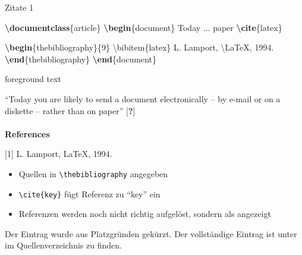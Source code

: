 \documentclass[aspectratio=169]{beamer}
\providecommand{\tightlist}{\setlength{\itemsep}{0pt}\setlength{\parskip}{0pt}}
\newenvironment{Shaded}{\begin{snugshade}}{\end{snugshade}}
\newcommand{\BuiltInTok}[1]{\textcolor[rgb]{0.25,0.67,0.19}{\textbf{#1}}}
\newcommand{\ExtensionTok}[1]{\textcolor[rgb]{0.25,0.67,0.19}{#1}}
\newcommand{\FunctionTok}[1]{\textcolor[rgb]{0.34,0.51,0.35}{#1}}
\newcommand{\KeywordTok}[1]{\textcolor[rgb]{0.25,0.67,0.19}{\textbf{#1}}}
\newcommand{\NormalTok}[1]{\textcolor[rgb]{0.19,0.19,0.19}{#1}}
\newenvironment{Shaded}{}{}
\newcommand\citestyle[1]{\textcolor{foreground-secondary}{\textsuperscript{#1}}}
\let\oldcite=\cite
\renewcommand{\cite}[1]{\citestyle{\oldcite{#1}}}
\let\oldautocite\autocite
\renewcommand{\autocite}[1]{\citestyle{\oldautocite{#1}}}
\begin{document}
    \begin{frame}[fragile]{Zitate 1}
    \protect\hypertarget{zitate-1}{}
    \begin{minipage}{0.66\textwidth}

\begin{Shaded}
\begin{Highlighting}[]
\BuiltInTok{\textbackslash{}documentclass}\NormalTok{\{}\ExtensionTok{article}\NormalTok{\}}
\KeywordTok{\textbackslash{}begin}\NormalTok{\{}\ExtensionTok{document}\NormalTok{\}}
\NormalTok{\textasciigrave{}\textasciigrave{}Today ... paper\textquotesingle{}\textquotesingle{} }\KeywordTok{\textbackslash{}cite}\NormalTok{\{}\ExtensionTok{latex}\NormalTok{\}}

\KeywordTok{\textbackslash{}begin}\NormalTok{\{}\ExtensionTok{thebibliography}\NormalTok{\}\{9\}}
    \FunctionTok{\textbackslash{}bibitem}\NormalTok{\{latex\} }
\NormalTok{    L. Lamport, }\FunctionTok{\textbackslash{}LaTeX}\NormalTok{, 1994.}
\KeywordTok{\textbackslash{}end}\NormalTok{\{}\ExtensionTok{thebibliography}\NormalTok{\}}
\KeywordTok{\textbackslash{}end}\NormalTok{\{}\ExtensionTok{document}\NormalTok{\}}
\end{Highlighting}
\end{Shaded}

    \end{minipage}\begin{minipage}{0.33\textwidth}

    \bgroup 
        \begin{OutputBox}
        \begin{beamercolorbox}{foreground text}
            \selectfont%

    ``Today you are likely to send a 
    document electronically -- by e-mail 
    or on a diskette -- 
    rather than on paper'' [\textbf{?}]
    \\ \\
    \textbf{\Large References}

    [1] L. Lamport, \LaTeX, 1994.

            \end{beamercolorbox}
        \end{OutputBox}
    \egroup

    \end{minipage}

    \begin{itemize}
    \tightlist
    \item
      Quellen in \texttt{\textbackslash{}thebibliography} angegeben
      \autocite{overleaf-bibtex}
    \item
      \texttt{\textbackslash{}cite\{key\}} fügt Referenz zu
      \enquote{key} ein \autocite{overleaf-bibtex}
    \item
      Referenzen werden noch nicht richtig aufgelöst, sondern als
      \mbox{\selectfont[\textbf{?}]} angezeigt
    \end{itemize}

    \textcolor{foreground-secondary}{\tiny Der Eintrag wurde aus Platzgründen gekürzt. Der vollständige Eintrag ist unter \cite{latex} im Quellenverzeichnis zu finden.}
    \end{frame}
\end{document}
